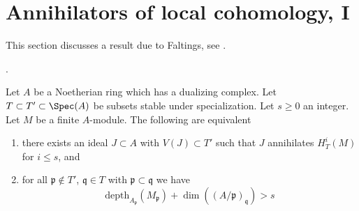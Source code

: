 \section{Annihilators of local cohomology, I}
\label{section-annihilators}

\noindent
This section discusses a result due to Faltings, see
\cite{Faltings-annulators}.

\begin{proposition}
\label{proposition-annihilator}
\begin{reference}
\cite{Faltings-annulators}.
\end{reference}
Let $A$ be a Noetherian ring which has a dualizing complex.
Let $T \subset T' \subset \Spec(A)$ be subsets stable under
specialization. Let $s \geq 0$ an integer. Let $M$ be a finite $A$-module.
The following are equivalent
\begin{enumerate}
\item there exists an ideal $J \subset A$ with $V(J) \subset T'$
such that $J$ annihilates $H^i_T(M)$ for $i \leq s$, and
\item for all $\mathfrak p \not \in T'$,
$\mathfrak q \in T$ with $\mathfrak p \subset \mathfrak q$
we have
$$
\text{depth}_{A_\mathfrak p}(M_\mathfrak p) +
\dim((A/\mathfrak p)_\mathfrak q) > s
$$
\end{enumerate}
\end{proposition}

